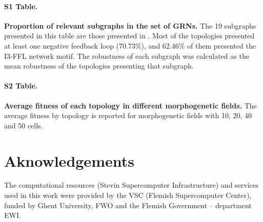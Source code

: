 \documentclass[10pt,letterpaper]{article}
\begin{document}
\paragraph*{S1 Table.}
\label{S1_Table}
{\bf Proportion of relevant subgraphs in the set of GRNs.}
The 19 subgraphs presented in this table are those presented in .
Most of the topologies presented at least one negative feedback loop (70.73\%),
and 62.46\% of them presented the I3-FFL network motif. The robustness of each
subgraph was calculated as the mean robustness of the topologies presenting that
subgraph.

\paragraph*{S2 Table.}
\label{S2_Table}
{\bf Average fitness of each topology in different morphogenetic fields.}
The average fitness by topology is reported for morphogenetic fields with 10, 20,
40 and 50 cells.

\section*{Aknowledgements}
The computational resources (Stevin Supercomputer Infrastructure) and
  services used in this work were provided by the VSC (Flemish Supercomputer
  Center), funded by Ghent University, FWO and the Flemish Government –
  department EWI.

\nolinenumbers

%
%
%
%
%
%
%

{}
\end{document}
